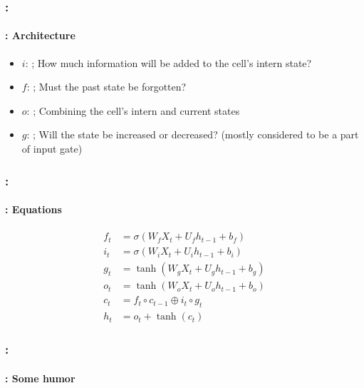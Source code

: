 \documentclass[xcolor=table]{beamer}
\begin{document}
\begin{frame}
	\frametitle{\insertshortsubtitle: \insertsection}
	\framesubtitle{\insertsubsection: Architecture}
	
	\begin{minipage}{0.50\textwidth} 
		\begin{itemize}
			\item $i$: ;
			How much information will be added to the cell's intern state?
			\item $f$: ;
			Must the past state be forgotten?
			\item $o$:  ;
			Combining the cell's intern and current states	
		\end{itemize}
	\end{minipage}
	\begin{minipage}{0.49\textwidth}
	\end{minipage}
	
	\begin{itemize}
		\item $g$: ;
		Will the state be  increased or decreased?
		(mostly considered to be a part of input gate)
		
	\end{itemize}

\end{frame}

\begin{frame}
	\frametitle{\insertshortsubtitle: \insertsection}
	\framesubtitle{\insertsubsection: Equations}
	\huge\vskip-24pt
	\begin{align*}
	f_t &= \sigma(W_f X_t + U_f h_{t-1} + b_f) \\
	i_t &= \sigma(W_i X_t + U_i h_{t-1} + b_i) \\
	g_t &= \tanh(W_g X_t + U_g h_{t-1} + b_g) \\
	o_t &= \tanh(W_o X_t + U_o h_{t-1} + b_o) \\
	c_t &= f_t \circ c_{t-1} \oplus i_t \circ g_t \\
	h_t &= o_t + \tanh(c_t)
	\end{align*}
\end{frame}

\begin{frame}
	\frametitle{\insertshortsubtitle: \insertsection}
	\framesubtitle{\insertsubsection: Some humor}

	\begin{center}
	\end{center}

\end{frame}
\end{document}
